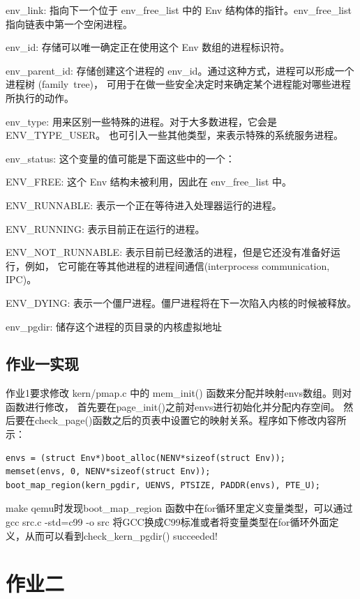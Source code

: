 \documentclass[12pt,a4paper,UTF8]{article}
\begin{document}
    env\_link:
    指向下一个位于 env\_free\_list 中的 Env 结构体的指针。env\_free\_list 指向链表中第一个空闲进程。
    
    env\_id:
    存储可以唯一确定正在使用这个 Env 数组的进程标识符。
    
    env\_parent\_id:
    存储创建这个进程的 env\_id。通过这种方式，进程可以形成一个 进程树 (family\ tree)，
    可用于在做一些安全决定时来确定某个进程能对哪些进程所执行的动作。
    
    env\_type:
    用来区别一些特殊的进程。对于大多数进程，它会是 ENV\_TYPE\_USER。
    也可引入一些其他类型，来表示特殊的系统服务进程。
    
    env\_status:
    这个变量的值可能是下面这些中的一个：

    ENV\_FREE: 这个 Env 结构未被利用，因此在 env\_free\_list 中。

    ENV\_RUNNABLE: 表示一个正在等待进入处理器运行的进程。

    ENV\_RUNNING: 表示目前正在运行的进程。

    ENV\_NOT\_RUNNABLE: 表示目前已经激活的进程，但是它还没有准备好运行，例如，
    它可能在等其他进程的进程间通信(interprocess communication, IPC)。

    ENV\_DYING: 表示一个僵尸进程。僵尸进程将在下一次陷入内核的时候被释放。
    
    env\_pgdir:
    储存这个进程的页目录的内核虚拟地址
   
    \subsection{作业一实现}
    作业1要求修改 kern/pmap.c 中的 mem\_init() 函数来分配并映射envs数组。则对函数进行修改，
    首先要在page\_init()之前对envs进行初始化并分配内存空间。
    然后要在check\_page()函数之后的页表中设置它的映射关系。程序如下修改内容所示：
    
    \begin{lstlisting}[style=CPP]
envs = (struct Env*)boot_alloc(NENV*sizeof(struct Env));
memset(envs, 0, NENV*sizeof(struct Env));
boot_map_region(kern_pgdir, UENVS, PTSIZE, PADDR(envs), PTE_U);
    \end{lstlisting}

    make qemu时发现boot\_map\_region 函数中在for循环里定义变量类型，可以通过gcc src.c -std=c99 -o src 
    将GCC换成C99标准或者将变量类型在for循环外面定义，从而可以看到check\_kern\_pgdir() succeeded!

\section{作业二}
\end{document}
